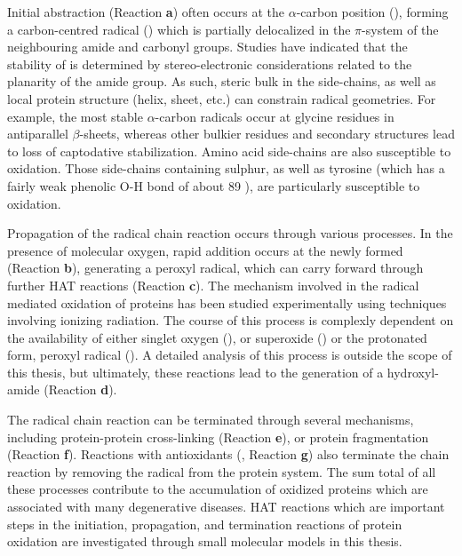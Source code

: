 Initial abstraction (Reaction \textbf{a}) often occurs at the $\alpha$-carbon position (), forming a carbon-centred radical () which is partially delocalized in the $\pi$-system of the neighbouring amide and carbonyl groups. Studies have indicated that the stability of  is determined by stereo-electronic considerations related to the planarity of the amide group.\cite{Salamone2014b} As such, steric bulk in the side-chains, as well as local protein structure (helix, sheet, etc.) can constrain radical geometries. For example, the most stable $\alpha$-carbon radicals occur at glycine residues in antiparallel $\beta$-sheets, whereas other bulkier residues and secondary structures lead to loss of captodative stabilization.\cite{Rauk2000} Amino acid side-chains are also susceptible to oxidation. Those side-chains containing sulphur,\cite{Stadtman2004} as well as tyrosine (which has a fairly weak phenolic O-H bond of about 89 \kcalmol),\cite{Mulder2005} are particularly susceptible to oxidation.

Propagation of the radical chain reaction occurs through various processes. In the presence of molecular oxygen, rapid addition occurs at the newly formed  (Reaction \textbf{b}), generating a peroxyl radical, which can carry forward through further HAT reactions (Reaction \textbf{c}).\cite{Stadtman2003} The mechanism involved in the radical mediated oxidation of proteins has been studied experimentally using techniques involving ionizing radiation.\cite{Garrison1962,Garrison1987} The course of this process is complexly dependent on the availability of either singlet oxygen (), or superoxide () or the protonated form, peroxyl radical (). A detailed analysis of this process is outside the scope of this thesis, but ultimately, these reactions lead to the generation of a hydroxyl-amide (Reaction \textbf{d}).

The radical chain reaction can be terminated through several mechanisms, including protein-protein cross-linking (Reaction \textbf{e}), or protein fragmentation (Reaction \textbf{f}). Reactions with antioxidants (, Reaction \textbf{g}) also terminate the chain reaction by removing the radical from the protein system. The sum total of all these processes contribute to the accumulation of oxidized proteins which are associated with many degenerative diseases.\cite{Halliwell2006} HAT reactions which are important steps in the initiation, propagation, and termination reactions of protein oxidation are investigated through small molecular models in this thesis.


